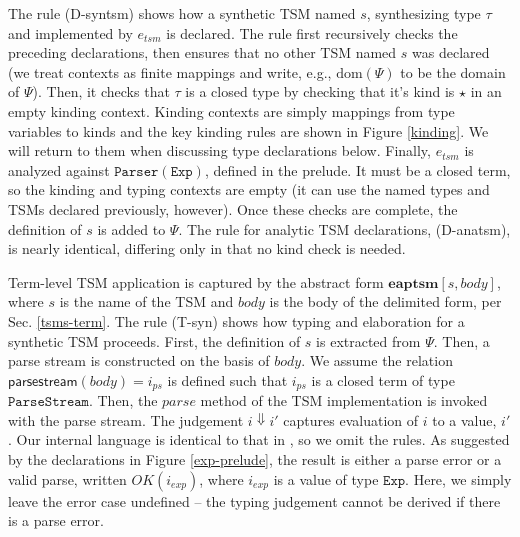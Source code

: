 \documentclass{sig-alternate}
\begin{document}
The rule (D-syntsm) shows how a synthetic TSM named $s$, synthesizing type $\tau$ and implemented by $e_{tsm}$ is declared. The rule first recursively checks the preceding declarations, then ensures that no other TSM named $s$ was declared  (we treat contexts as finite mappings and write, e.g., $\text{dom}(\Psi)$ to be the domain of $\Psi$). Then, it checks that $\tau$ is a closed type by checking that it's kind is $\star$ in an empty kinding context. Kinding contexts are simply mappings from type variables to kinds and the key kinding rules are shown in Figure \ref{kinding}. We will return to them when discussing type declarations below. Finally, $e_{tsm}$ is analyzed against  $\mathtt{Parser}(\mathtt{Exp})$, defined in the prelude. It must be a closed term, so the kinding and typing contexts are empty (it can use the named types and TSMs declared previously, however). Once these checks are complete, the definition of $s$ is added to $\Psi$. The rule for analytic TSM declarations, (D-anatsm), is nearly identical, differing only in that no kind check is needed.

Term-level TSM application is captured by the abstract form $\textbf{eaptsm}[s, body]$, where $s$ is the name of the TSM and $body$ is the body of the delimited form, per Sec. \ref{tsms-term}. The rule (T-syn) shows how typing and elaboration for a synthetic TSM proceeds. First, the definition of $s$ is extracted from $\Psi$. Then, a parse stream is constructed on the basis of $body$. We assume the relation $\textsf{parsestream}(body)=i_{ps}$ is defined such that $i_{ps}$ is a closed term of type $\mathtt{ParseStream}$. Then, the $parse$ method of the TSM implementation is invoked with the parse stream. The judgement $i \Downarrow i'$ captures evaluation of $i$ to a value, $i'$. Our internal language is identical to that in \cite{TSLs}, so we omit the rules. As suggested by the declarations in Figure \ref{exp-prelude}, the result is either a parse error or a valid parse, written $OK(i_{exp})$, where $i_{exp}$ is a value of type $\mathtt{Exp}$. Here, we simply leave the error case undefined -- the typing judgement cannot be derived if there is a parse error.%
\end{document}
